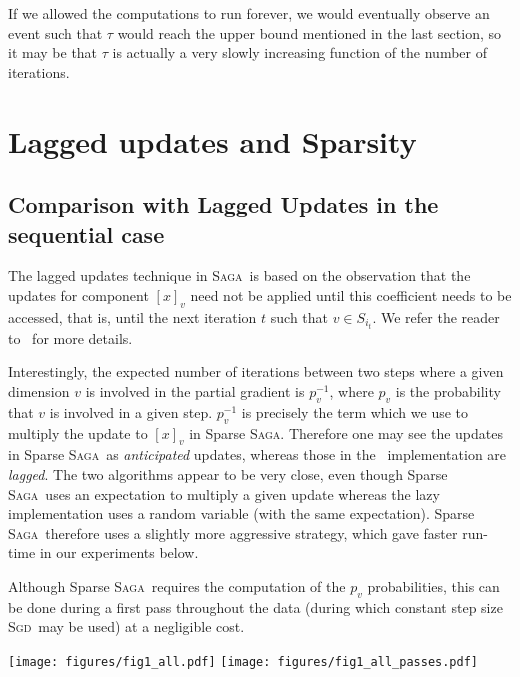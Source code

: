 \documentclass[twoside]{article}
\newcommand{\overlap}{\tau}
\newcommand{\SAGA}{\textsc{Saga}}
\newcommand{\SGD}{\textsc{Sgd}}
\begin{document}
If we allowed the computations to run forever, we would eventually observe an event such that $\overlap$ would reach the upper bound mentioned in the last section, so it may be that $\overlap$ is actually a very slowly increasing function of the number of iterations.

\section{Lagged updates and Sparsity}\label{apxC}

\subsection{Comparison with Lagged Updates in the sequential case}
The lagged updates technique in \SAGA\ is based on the observation that the updates for component $[x]_v$ need not be applied until this coefficient needs to be accessed, that is, until the next iteration $t$ such that $ v \in S_{i_t}$. 
We refer the reader to~\citet{laggedsaga} for more details.

Interestingly, the expected number of iterations between two steps where a given dimension $v$ is involved in the partial gradient is $p_v^{-1}$, where $p_v$ is the probability that $v$ is involved in a given step. 
$p_v^{-1}$ is precisely the term which we use to multiply the update to $[x]_v$ in Sparse \SAGA. 
Therefore one may see the updates in Sparse \SAGA\ as \textit{anticipated} updates, whereas those in the~\citet{laggedsaga} implementation are \textit{lagged}. 
The two algorithms appear to be very close, even though Sparse \SAGA\ uses an expectation to multiply a given update whereas the lazy implementation uses a random variable (with the same expectation). Sparse \SAGA\ therefore uses a slightly more aggressive strategy, which gave faster run-time in our experiments below.

Although Sparse \SAGA\ requires the computation of the $p_v$ probabilities, this can be done during a first pass throughout the data (during which constant step size \SGD\ may be used) at a negligible cost. 

\begin{figure*}
\texttt{[image: figures/fig1\_all.pdf]}
\texttt{[image: figures/fig1\_all\_passes.pdf]}
\caption{{\bf Lagged vs sparse \SAGA\ updates}. 
Suboptimality with respect to time for different \SAGA\ update schemes on various datasets. First row: suboptimality as a function of time. Second row: suboptimality as a the number of passes over the dataset.
For sparse datasets (RCV1 and Real-sim), lagged and sparse updates have a lower cost per iteration which result in faster convergence.}\label{fig:fig_1}
\end{figure*} 
\end{document}
